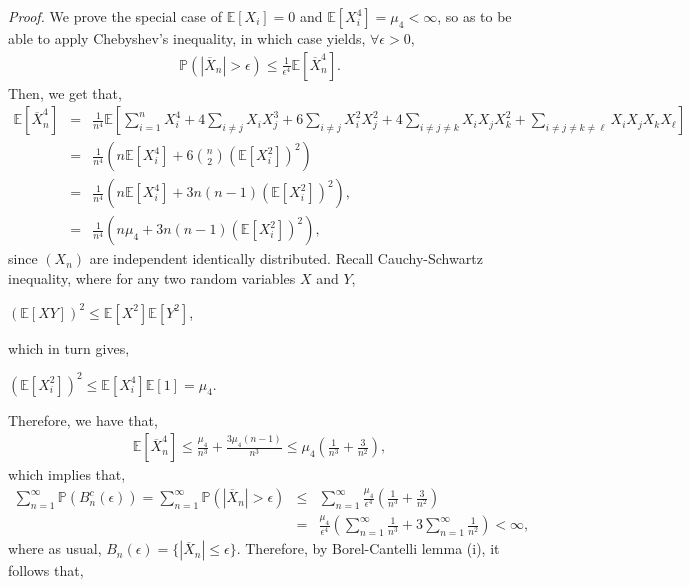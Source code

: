 \documentclass{article}
\begin{document}
\textit{Proof.} We prove the special case of $\mathbb{E}[X_i] = 0$ and $\mathbb{E}[X_i^4] = \mu_4 < \infty$, so as to be able to apply Chebyshev's inequality, in which case yields, $\forall \epsilon > 0$,
\begin{eqnarray}
\nonumber
\mathbb{P}(|\overline{X}_n| > \epsilon) \leq \frac{1}{\epsilon^4}\mathbb{E}[\overline{X}_n^4].
\end{eqnarray}
Then, we get that,
\begin{eqnarray}
\nonumber
\mathbb{E}\left[\overline{X}_n^4\right] &=& \frac{1}{n^4}\mathbb{E}\left[\sum_{i=1}^{n}X_i^4 + 4\sum_{i \neq j}X_iX_j^3 + 6\sum_{i \neq j}X_i^2X_j^2 + 4\sum_{i \neq j \neq k}X_iX_jX_k^2 + \sum_{i \neq j \neq k \neq \ell}X_iX_jX_kX_{\ell}\right]\\
\nonumber
&=& \frac{1}{n^4}\left(n\mathbb{E}[X_i^4] + 6\binom{n}{2}(\mathbb{E}[X_i^2])^2\right)\\
\nonumber
&=& \frac{1}{n^4}(n\mathbb{E}[X_i^4] + 3n(n-1)(\mathbb{E}[X_i^2])^2),\\
\nonumber
&=& \frac{1}{n^4}(n\mu_4 + 3n(n-1)(\mathbb{E}[X_i^2])^2),
\end{eqnarray}
since $(X_n)$ are independent identically distributed. Recall Cauchy-Schwartz inequality, where for any two random variables $X$ and $Y$,
\begin{center}
	$(\mathbb{E}[XY])^2 \leq \mathbb{E}[X^2]\mathbb{E}[Y^2]$,
\end{center}
which in turn gives,
\begin{center}
	$(\mathbb{E}[X_i^2])^2 \leq \mathbb{E}[X_i^4]\mathbb{E}[1] = \mu_4$.
\end{center}
Therefore, we have that,
\begin{eqnarray}
\nonumber
\mathbb{E}\left[\overline{X}_n^4\right] \leq \frac{\mu_4}{n^3} + \frac{3\mu_4(n-1)}{n^3} \leq \mu_4\left(\frac{1}{n^3} + \frac{3}{n^2}\right),
\end{eqnarray}
which implies that,
\begin{eqnarray}
\nonumber
\sum_{n=1}^{\infty}\mathbb{P}(B_n^c(\epsilon)) = \sum_{n=1}^{\infty}\mathbb{P}(|\overline{X}_n| > \epsilon) &\leq& \sum_{n=1}^{\infty}\frac{\mu_4}{\epsilon^4}\left(\frac{1}{n^3} + \frac{3}{n^2}\right)\\
\nonumber
&=& \frac{\mu_4}{\epsilon^4}\left(\sum_{n=1}^{\infty}\frac{1}{n^3} + 3\sum_{n=1}^{\infty}\frac{1}{n^2}\right) < \infty,
\end{eqnarray}
where as usual, $B_n(\epsilon) = \{|\overline{X}_n| \leq \epsilon\}$. Therefore, by Borel-Cantelli lemma (i), it follows that,
\end{document}
